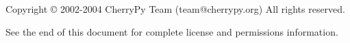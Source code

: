 Copyright \copyright{} 2002-2004 CherryPy Team (team@cherrypy.org)
All rights reserved.

See the end of this document for complete license and permissions
information.
